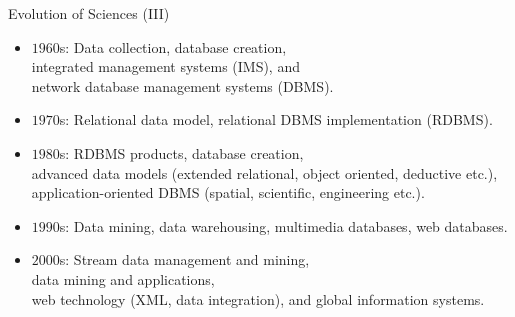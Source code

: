 \begin{frame}{Evolution of Sciences (III)}
	\begin{itemize}
		\item $1960$s: Data collection, database creation, \\
		      \hspace{1cm} integrated management systems (IMS), and \\
		      \hspace{1cm} network database management systems (DBMS).
		\item $1970$s: Relational data model, relational DBMS implementation
		      (RDBMS).
		\item $1980$s: RDBMS products, database creation, \\
		      \hspace{1cm} advanced data models (extended relational, object
		      oriented, deductive etc.),\\
		      \hspace{1cm} application-oriented DBMS (spatial, scientific,
		      engineering etc.).
		\item $1990$s: Data mining, data warehousing, multimedia databases, web
		      databases.
		\item $2000$s: Stream data management and mining,\\
		      \hspace{1cm} data mining and applications, \\
		      \hspace{1cm} web technology (XML, data integration), and global
		      information systems.
	\end{itemize}
\end{frame}

